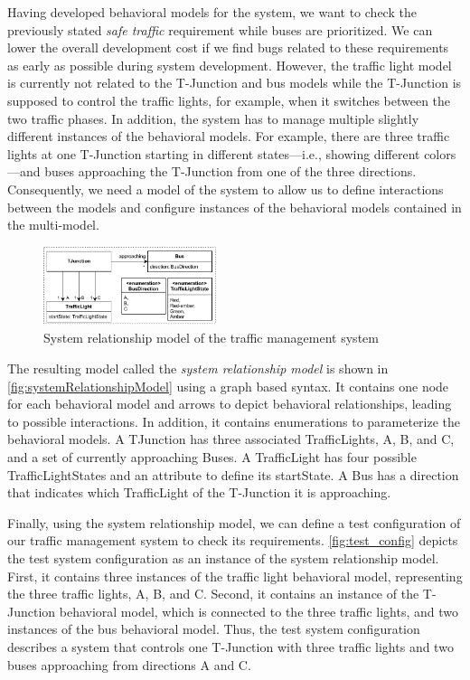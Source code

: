 \documentclass{jot}
\begin{document}
Having developed behavioral models for the system, we want to check the previously stated \emph{safe traffic} requirement while buses are prioritized.
We can lower the overall development cost if we find bugs related to these requirements as early as possible during system development.
However, the traffic light model is currently not related to the T-Junction and bus models while the T-Junction is supposed to control the traffic lights, for example, when it switches between the two traffic phases.
In addition, the system has to manage multiple slightly different instances of the behavioral models.
For example, there are three traffic lights at one T-Junction starting in different states---i.e., showing different colors---and buses approaching the T-Junction from one of the three directions.
Consequently, we need a model of the system to allow us to define interactions between the models and configure instances of the behavioral models contained in the multi-model.

\begin{figure}[h]
    \centering
    \includegraphics[width=0.45\textwidth]{figures/systemRelationShipModel.pdf}
    \caption{System relationship model of the traffic management system}
    \label{fig:systemRelationshipModel}
\end{figure}



The resulting model called the \emph{system relationship model} is shown in \autoref{fig:systemRelationshipModel} using a graph based syntax.
It contains one node for each behavioral model and arrows to depict behavioral relationships, leading to possible interactions.
In addition, it contains enumerations to parameterize the behavioral models. 
A \textsf{TJunction} has three associated \textsf{TrafficLight}s, \textsf{A}, \textsf{B}, and \textsf{C}, and a set of currently approaching \textsf{Bus}es.
A \textsf{TrafficLight} has four possible \textsf{TrafficLightState}s and an attribute to define its \textsf{startState}.
A \textsf{Bus} has a \textsf{direction} that indicates which \textsf{TrafficLight} of the T-Junction it is approaching.

Finally, using the system relationship model, we can define a test configuration of our traffic management system to check its requirements.
\autoref{fig:test_config} depicts the test system configuration as an instance of the system relationship model.
First, it contains three instances of the traffic light behavioral model, representing the three traffic lights, \textsf{A}, \textsf{B}, and \textsf{C}.
Second, it contains an instance of the T-Junction behavioral model, which is connected to the three traffic lights, and two instances of the bus behavioral model.
Thus, the test system configuration describes a system that controls one T-Junction with three traffic lights and two buses approaching from directions A and C.
\end{document}
